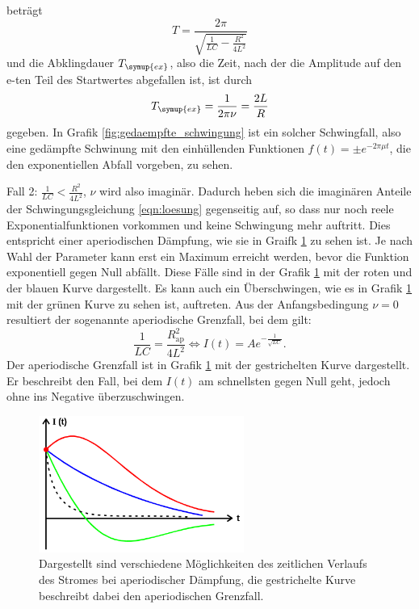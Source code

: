 beträgt
\begin{equation}
  T = \frac{2\pi}{\sqrt{\frac{1}{L C}-\frac{R^2}{4 L^2}}}
  \label{eqn:periode}
\end{equation}
und die Abklingdauer $T_\symup{ex}$, also die Zeit, nach der die Amplitude auf den
e-ten Teil des Startwertes abgefallen ist, ist durch
\begin{equation}
  T_\symup{ex} = \frac{1}{2\pi\nu} = \frac{2L}{R}
  \label{eqn:abklingzeit}
\end{equation}
gegeben. In Grafik \ref{fig:gedaempfte_schwingung} ist ein solcher Schwingfall,
also eine gedämpfte Schwinung mit den einhüllenden Funktionen $f(t)=\pm e^{-2\pi\mu t}$,
die den exponentiellen Abfall vorgeben, zu sehen.


Fall 2: $\frac{1}{L C} < \frac{R^2}{4L^2}$, $\nu$ wird also imaginär. Dadurch heben
sich die imaginären Anteile der Schwingungsgleichung \eqref{eqn:loesung} gegenseitig
auf, so dass nur noch reele Exponentialfunktionen vorkommen und keine Schwingung
mehr auftritt. Dies entspricht einer aperiodischen Dämpfung, wie sie in Graifk
\ref{fig:ap_grenzfall} zu sehen ist. Je nach Wahl der Parameter kann erst ein Maximum
erreicht werden, bevor die Funktion exponentiell gegen Null abfällt. Diese Fälle
sind in der Grafik \ref{fig:ap_grenzfall} mit der roten und der blauen Kurve
dargestellt. Es kann auch ein Überschwingen, wie es in Grafik \ref{fig:ap_grenzfall}
mit der grünen Kurve zu sehen ist, auftreten.
Aus der Anfangsbedingung $\nu=0$ resultiert der sogenannte aperiodische Grenzfall,
bei dem gilt:
\begin{equation}
  \frac{1}{L C} = \frac{R_{\text{ap}}^2}{4 L^2} \iff I(t) = A e^{-\frac{1}{\sqrt{L C}}}.
  \label{eqn:bedingung-ap-grenzfall}
\end{equation}
Der aperiodische Grenzfall ist in Grafik \ref{fig:ap_grenzfall} mit der gestrichelten
Kurve dargestellt. Er beschreibt den Fall, bei dem $I(t)$ am schnellsten gegen Null
geht, jedoch ohne ins Negative überzuschwingen.
\begin{figure}
  \centering
  \includegraphics[width=0.6\textwidth]{ap_grenzfall.png}
  \caption{Dargestellt sind verschiedene Möglichkeiten des zeitlichen Verlaufs des
  Stromes bei aperiodischer Dämpfung, die gestrichelte Kurve beschreibt dabei den
  aperiodischen Grenzfall\cite{sample}.}
  \label{fig:ap_grenzfall}
\end{figure}

